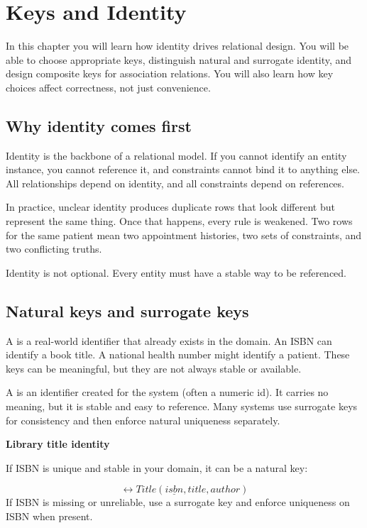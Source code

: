 \chapter{Keys and Identity}

\begin{learningobjectives}
In this chapter you will learn how identity drives relational design.
You will be able to choose appropriate keys, distinguish natural and surrogate identity, and design composite keys for association relations.
You will also learn how key choices affect correctness, not just convenience.
\end{learningobjectives}

\section{Why identity comes first}
Identity is the backbone of a relational model.
If you cannot identify an entity instance, you cannot reference it, and constraints cannot bind it to anything else.
All relationships depend on identity, and all constraints depend on references.

In practice, unclear identity produces duplicate rows that look different but represent the same thing.
Once that happens, every rule is weakened.
Two rows for the same patient mean two appointment histories, two sets of constraints, and two conflicting truths.

\begin{principlebox}
Identity is not optional.
Every entity must have a stable way to be referenced.
\end{principlebox}

\section{Natural keys and surrogate keys}
A  is a real-world identifier that already exists in the domain.
An ISBN can identify a book title.
A national health number might identify a patient.
These keys can be meaningful, but they are not always stable or available.

A  is an identifier created for the system (often a numeric id).
It carries no meaning, but it is stable and easy to reference.
Many systems use surrogate keys for consistency and then enforce natural uniqueness separately.

\begin{examplebox}
\textbf{Library title identity}\par\smallskip
If ISBN is unique and stable in your domain, it can be a natural key:\par
\[
\rel{Title}(\underline{isbn}, title, author)
\]
If ISBN is missing or unreliable, use a surrogate key and enforce uniqueness on ISBN when present.
\end{examplebox}

